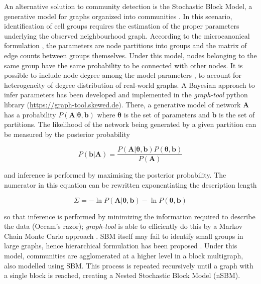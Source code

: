 \documentclass[10pt]{article}
\begin{document}
An alternative solution to community detection is the Stochastic Block Model, a generative model for graphs organized into communities \cite{holland_1983}. In this scenario, identification of cell groups requires the estimation of the proper parameters underlying the observed neighbourhood graph. According to the microcanonical formulation \cite{peixoto_2017}, the parameters are node partitions into groups and the matrix of edge counts between groups themselves. Under this model, nodes belonging to the same group have the same probability to be connected with other nodes. It is possible to include node degree among the model parameters \cite{karrer_2011}, to account for heterogeneity of degree distribution of real-world graphs. A Bayesian approach to infer parameters has been developed \cite{peixoto_2013} and implemented in the \emph{graph-tool} python library (\href{https://graph-tool.skewed.de}{https:/\slash graph-tool.skewed.de}). There, a generative model of network $\boldsymbol A$ has a probability $P(\boldsymbol A|\boldsymbol\theta, \boldsymbol b)$ where \textbf{$\boldsymbol\theta$} is the set of parameters and \textbf{\emph{$\boldsymbol b$}} is the set of partitions. The likelihood of the network being generated by a given partition can be measured by the posterior probability


\begin{MPEquation}[!ht]
\begin{equation}
P(\boldsymbol b | \boldsymbol A) = \frac{P(\boldsymbol A|\boldsymbol\theta, \boldsymbol b)P(\boldsymbol\theta, \boldsymbol b)}{P(\boldsymbol A)}
\end{equation}
\label{MPEquationElement:820CB015-E51E-4C5A-BD9C-70E667B8F73B}
\end{MPEquation}
and inference is performed by maximising the posterior probability. The numerator in this equation can be rewritten exponentiating the description length


\begin{MPEquation}[!ht]
\begin{equation}
\Sigma = -\ln P(\boldsymbol A|\boldsymbol\theta, \boldsymbol b) - \ln P(\boldsymbol\theta, \boldsymbol b)
\end{equation}
\label{MPEquationElement:676396C0-2D6F-4084-89B1-951DE3032087}
\end{MPEquation}
so that inference is performed by minimizing the information required to describe the data (Occam's razor); \emph{graph-tool} is able to efficiently do this by a Markov Chain Monte Carlo approach \cite{peixoto_2014}. SBM itself may fail to identify small groups in large graphs, hence hierarchical formulation has been proposed \cite{peixoto_2014_h}. Under this model, communities are agglomerated at a higher level in a block multigraph, also modelled using SBM. This process is repeated recursively until a graph with a single block is reached, creating a Nested Stochastic Block Model (nSBM).
\end{document}
